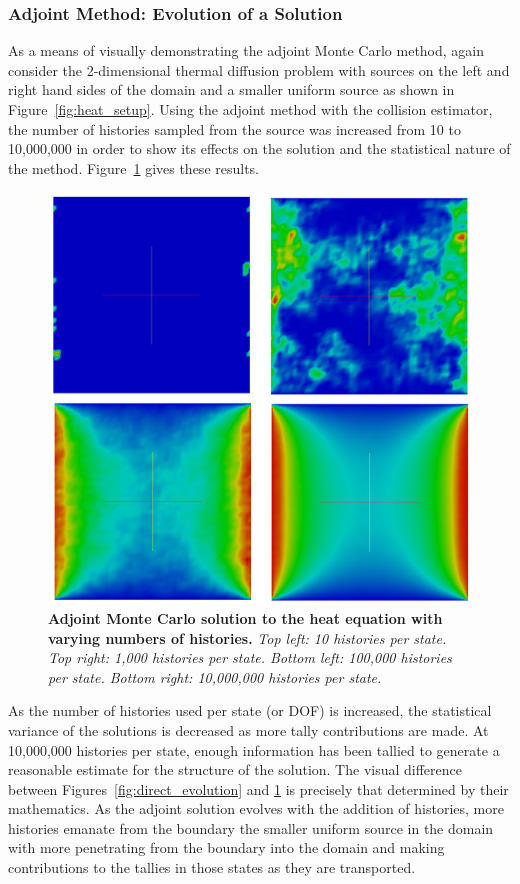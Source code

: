 \subsubsection{Adjoint Method: Evolution of a Solution}
\label{subsec:adjoint_evolution}
As a means of visually demonstrating the adjoint Monte Carlo method,
again consider the 2-dimensional thermal diffusion problem with
sources on the left and right hand sides of the domain and a smaller
uniform source as shown in Figure~\ref{fig:heat_setup}. Using the
adjoint method with the collision estimator, the number of histories
sampled from the source was increased from 10 to 10,000,000 in order
to show its effects on the solution and the statistical nature of the
method. Figure~\ref{fig:adjoint_evolution} gives these results.
\begin{figure}[t!]
  \begin{center}
    \includegraphics[width=6in]{chapters/mc_background/adjoint_evolution.png}
  \end{center}
  \caption{\textbf{Adjoint Monte Carlo solution to the heat equation
      with varying numbers of histories.} \textit{Top left: 10
      histories per state. Top right: 1,000 histories per
      state. Bottom left: 100,000 histories per state. Bottom right:
      10,000,000 histories per state.}}
  \label{fig:adjoint_evolution}
\end{figure}
As the number of histories used per state (or DOF) is increased, the
statistical variance of the solutions is decreased as more tally
contributions are made. At 10,000,000 histories per state, enough
information has been tallied to generate a reasonable estimate for the
structure of the solution. The visual difference between
Figures~\ref{fig:direct_evolution} and \ref{fig:adjoint_evolution} is
precisely that determined by their mathematics. As the adjoint
solution evolves with the addition of histories, more histories
emanate from the boundary the smaller uniform source in the domain
with more penetrating from the boundary into the domain and making
contributions to the tallies in those states as they are transported.

